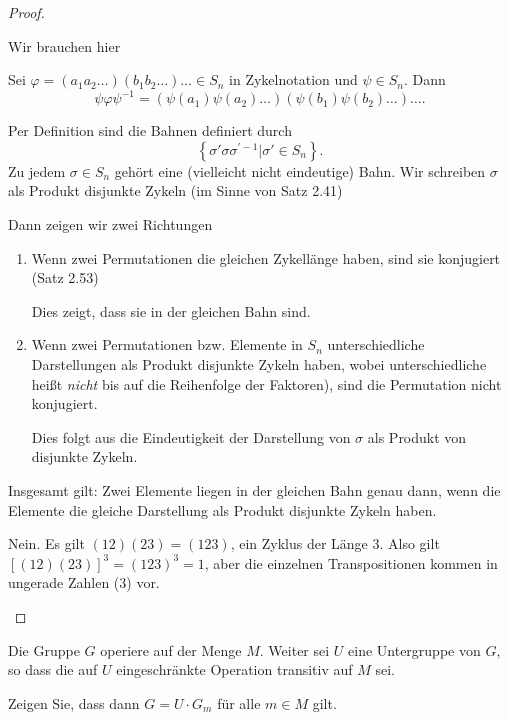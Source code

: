 \begin{proof}
	\begin{parts}
	\item Wir brauchen hier
		\begin{tcolorbox}[title=Satz 2.52]
Sei $\varphi = (a_1a_2\dots)(b_1b_2\dots)\dots\in S_n$ in Zykelnotation und $\psi \in S_n$. Dann
\[
	\psi\varphi\psi^{-1}=(\psi(a_1)\psi(a_2)\dots)(\psi(b_1)\psi(b_2)\dots)\dots
.\] 
		\end{tcolorbox}
		Per Definition sind die Bahnen definiert durch
		\[
			\left\{ \sigma'\sigma\sigma^{\prime-1}|\sigma'\in S_n \right\} 
		.\] 
		Zu jedem $\sigma\in S_n$ gehört eine (vielleicht nicht eindeutige) Bahn. Wir schreiben $\sigma$ als Produkt disjunkte Zykeln (im Sinne von Satz 2.41) 

		Dann zeigen wir zwei Richtungen
		\begin{enumerate}[label=(\roman*)]
			\item Wenn zwei Permutationen die gleichen Zykellänge haben, sind sie konjugiert (Satz 2.53)

				Dies zeigt, dass sie in der gleichen Bahn sind.
			\item Wenn zwei Permutationen bzw. Elemente in $S_n$ unterschiedliche Darstellungen als Produkt disjunkte Zykeln haben, wobei unterschiedliche heißt \emph{nicht} bis auf die Reihenfolge der Faktoren), sind die Permutation nicht konjugiert.

				Dies folgt aus die Eindeutigkeit der Darstellung von $\sigma$ als Produkt von disjunkte Zykeln. 
		\end{enumerate}
		Insgesamt gilt: Zwei Elemente liegen in der gleichen Bahn genau dann, wenn die Elemente die gleiche Darstellung als Produkt disjunkte Zykeln haben. 
	\item Nein. Es gilt $(12)(23)=(123)$, ein Zyklus der Länge 3. Also gilt $\left[ (12)(23) \right]^3=(123)^3=1$, aber die einzelnen Transpositionen kommen in ungerade Zahlen (3) vor.\qedhere
	\end{parts}
\end{proof}
\begin{Problem}
	Die Gruppe $G$ operiere auf der Menge $M$. Weiter sei $U$ eine Untergruppe von $G$, so dass die auf $U$ eingeschränkte Operation transitiv auf $M$ sei.

	Zeigen Sie, dass dann $G=U\cdot G_m$ f\"{u}r alle $m\in M$ gilt.
\end{Problem}
